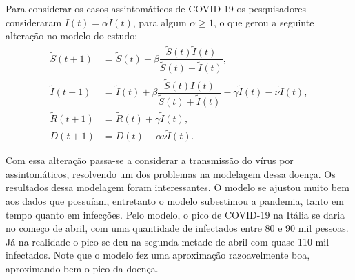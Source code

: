 \documentclass{article}
\begin{document}
Para considerar os casos assintomáticos de COVID-19 os pesquisadores consideraram $I(t) = \alpha\tilde{I}(t)$, para algum $\alpha \geq 1$, o que gerou a seguinte alteração no modelo do estudo:
\begin{equation*}
    \begin{split}
        \tilde{S}(t + 1) & = \tilde{S}(t) - \beta \dfrac{\tilde{S}(t) \tilde{I}(t)}{\tilde{S}(t) + \tilde{I}(t)}, \\
        \tilde{I}(t + 1) & = \tilde{I}(t) + \beta \dfrac{\tilde{S}(t) I(t)}{\tilde{S}(t) + \tilde{I}(t)} - \gamma \tilde{I}(t) - \nu \tilde{I}(t), \\
        \tilde{R}(t + 1) & = \tilde{R}(t) + \gamma \tilde{I}(t), \\
        D(t + 1) & = D(t) + \alpha \nu \tilde{I}(t).
    \end{split}
\end{equation*}

Com essa alteração passa-se a considerar a transmissão do vírus por assintomáticos, resolvendo um dos problemas na modelagem dessa doença. Os resultados dessa modelagem foram interessantes. O modelo se ajustou muito bem aos dados que possuíam, entretanto o modelo subestimou a pandemia, tanto em tempo quanto em infecções. Pelo modelo, o pico de COVID-19 na Itália se daria no começo de abril, com uma quantidade de infectados entre 80 e 90 mil pessoas. Já na realidade o pico se deu na segunda metade de abril com quase 110 mil infectados. Note que o modelo fez uma aproximação razoavelmente boa, aproximando bem o pico da doença.
% 
\end{document}
